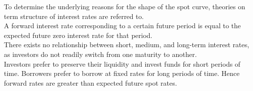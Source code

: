 \documentclass[a4paper,oneside,openany]{book}
\begin{document}
To determine the underlying reasons for the shape of the spot curve, theories on term structure of interest rates are referred to.\\

 A forward interest rate corresponding to a certain future period is equal to the expected future zero interest rate for that period.\\

 There exists no relationship between short, medium, and long-term interest rates, as investors do not readily switch from one maturity to another.\\

 Investors prefer to preserve their liquidity and invest funds for short periods of time. Borrowers prefer to borrow at fixed rates for long periods of time. Hence forward rates are greater than expected future spot rates.
\end{document}
